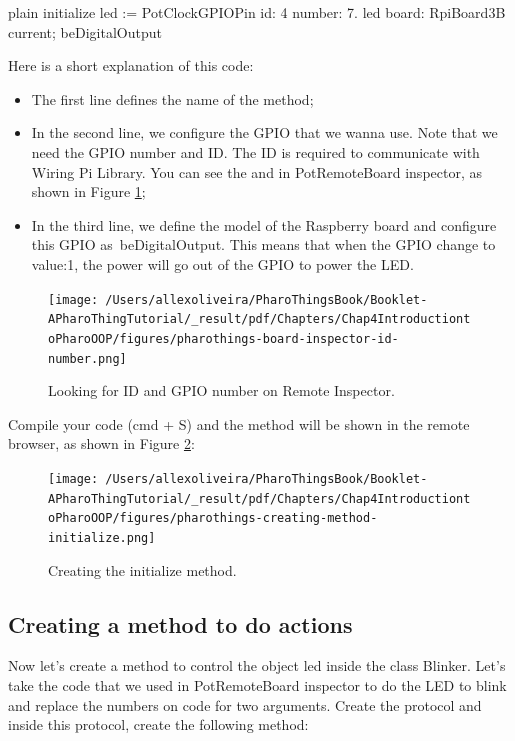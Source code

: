 \documentclass[10pt,twoside,english]{_support/latex/sbabook/sbabook}
\begin{document}
\begin{displaycode}{plain}
initialize 
  led := PotClockGPIOPin id: 4 number: 7. 
  led board: RpiBoard3B current; beDigitalOutput
\end{displaycode}

Here is a short explanation of this code:

\begin{itemize}
\item The first line defines the name of the method;
\item In the second line, we configure the GPIO that we wanna use. Note that we need the GPIO number and ID. The ID is required to communicate with Wiring Pi Library. You can see the  and  in PotRemoteBoard inspector, as shown in Figure \ref{RemoteInspector};
\item In the third line, we define the model of the Raspberry board and configure this GPIO as beDigitalOutput. This means that when the GPIO change to value:1, the power will go out of the GPIO to power the LED.
\end{itemize}


\begin{figure}

\begin{center}
\texttt{[image: /Users/allexoliveira/PharoThingsBook/Booklet-APharoThingTutorial/\_result/pdf/Chapters/Chap4IntroductiontoPharoOOP/figures/pharothings-board-inspector-id-number.png]}\caption{Looking for ID and GPIO number on Remote Inspector.\label{RemoteInspector}}\end{center}
\end{figure}


Compile your code (cmd + S) and the method will be shown in the remote browser, as shown in Figure \ref{InitializeMethod}:


\begin{figure}

\begin{center}
\texttt{[image: /Users/allexoliveira/PharoThingsBook/Booklet-APharoThingTutorial/\_result/pdf/Chapters/Chap4IntroductiontoPharoOOP/figures/pharothings-creating-method-initialize.png]}\caption{Creating the initialize method.\label{InitializeMethod}}\end{center}
\end{figure}

\subsection{Creating a method to do actions}
Now let's create a method to control the object led inside the class Blinker. Let's take the code that we used in PotRemoteBoard inspector to do the LED to blink and replace the numbers on code for two arguments. Create the protocol  and inside this protocol, create the following method:
\end{document}
